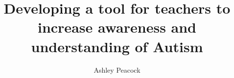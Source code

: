 \documentclass[11pt]{report}
\begin{document}
\title{Developing a tool for teachers to increase awareness and understanding of Autism}
\author{Ashley Peacock}
\maketitle

\tableofcontents













{}

\end{document}
